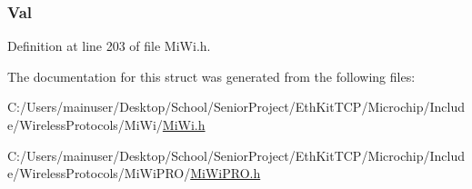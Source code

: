 \subsubsection[{Val}]{ Val}\label{struct_i_n_d_i_r_e_c_t___m_e_s_s_a_g_e_a5ab8c2bf45b20b5f7aa3a4f083896cec}


Definition at line 203 of file Mi\+Wi.\+h.



The documentation for this struct was generated from the following files\+:\begin{DoxyCompactItemize}
\item 
C\+:/\+Users/mainuser/\+Desktop/\+School/\+Senior\+Project/\+Eth\+Kit\+T\+C\+P/\+Microchip/\+Include/\+Wireless\+Protocols/\+Mi\+Wi/\hyperlink{_mi_wi_8h}{Mi\+Wi.\+h}\item 
C\+:/\+Users/mainuser/\+Desktop/\+School/\+Senior\+Project/\+Eth\+Kit\+T\+C\+P/\+Microchip/\+Include/\+Wireless\+Protocols/\+Mi\+Wi\+P\+R\+O/\hyperlink{_mi_wi_p_r_o_8h}{Mi\+Wi\+P\+R\+O.\+h}\end{DoxyCompactItemize}
